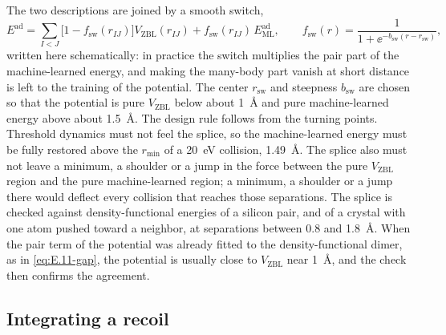 The two descriptions are joined by a smooth switch,
\begin{equation}
  E^{\mathrm{ad}} = \sum_{I<J}\bigl[1 - f_{\mathrm{sw}}(r_{IJ})\bigr]V_{\mathrm{ZBL}}(r_{IJ}) + f_{\mathrm{sw}}(r_{IJ})\,E^{\mathrm{ad}}_{\mathrm{ML}},
  \qquad f_{\mathrm{sw}}(r) = \frac{1}{1 + \ee^{-b_{\mathrm{sw}}(r - r_{\mathrm{sw}})}},
  \label{eq:E.11-splice}
\end{equation}
written here schematically: in practice the switch multiplies the pair part of the machine-learned energy, and making the many-body part vanish at short distance is left to the training of the potential. The center $r_{\mathrm{sw}}$ and steepness $b_{\mathrm{sw}}$ are chosen so that the potential is pure $V_{\mathrm{ZBL}}$ below about \SI{1}{\angstrom} and pure machine-learned energy above about \SI{1.5}{\angstrom}. The design rule follows from the turning points. Threshold dynamics must not feel the splice, so the machine-learned energy must be fully restored above the $r_{\mathrm{min}}$ of a \SI{20}{eV} collision, \SI{1.49}{\angstrom}. The splice also must not leave a minimum, a shoulder or a jump in the force between the pure $V_{\mathrm{ZBL}}$ region and the pure machine-learned region; a minimum, a shoulder or a jump there would deflect every collision that reaches those separations. The splice is checked against density-functional energies of a silicon pair, and of a crystal with one atom pushed toward a neighbor, at separations between 0.8 and \SI{1.8}{\angstrom}. When the pair term of the potential was already fitted to the density-functional dimer, as in \cref{eq:E.11-gap}, the potential is usually close to $V_{\mathrm{ZBL}}$ near \SI{1}{\angstrom}, and the check then confirms the agreement.

\subsection{Integrating a recoil}

